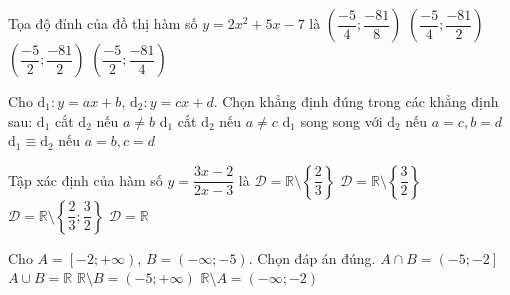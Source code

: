 \begin{ex}%
Tọa độ đỉnh của đồ thị hàm số $y = 2x^2 + 5x -7$ là
	\choice
	{\True $\left(\dfrac{-5}{4}; \dfrac{-81}{8}\right)$}
	{$\left(\dfrac{-5}{4}; \dfrac{-81}{2}\right)$}
	{$\left(\dfrac{-5}{2}; \dfrac{-81}{2}\right)$}
	{$\left(\dfrac{-5}{2}; \dfrac{-81}{4}\right)$}
\end{ex}

\begin{ex}%
Cho $\mathrm{d}_1\colon y = ax + b$, $\mathrm{d}_2\colon y = cx + d$. Chọn khẳng định đúng trong các khẳng định sau:
	\choice
	{$\mathrm{d}_1$ cắt $\mathrm{d}_2$ nếu $a \neq b$}
	{\True $\mathrm{d}_1$ cắt $\mathrm{d}_2$ nếu $a \neq c$}
	{$\mathrm{d}_1$ song song với $\mathrm{d}_2$ nếu $a = c, b = d$}
	{$\mathrm{d}_1 \equiv \mathrm{d}_2$ nếu $a = b, c = d$}
\end{ex}

\begin{ex}%
Tập xác định của hàm số $y = \dfrac{3x - 2}{2x - 3}$ là
	\choice
	{$\mathscr{D} = \mathbb{R}\setminus \left\lbrace \dfrac{2}{3}\right\rbrace $}
	{\True $\mathscr{D} = \mathbb{R}\setminus \left\lbrace \dfrac{3}{2}\right\rbrace $}
	{$\mathscr{D} = \mathbb{R}\setminus \left\lbrace \dfrac{2}{3}; \dfrac{3}{2}\right\rbrace $}
	{$\mathscr{D} = \mathbb{R}$}
\end{ex}


\begin{ex}%
Cho $A = \left[ -2; +\infty\right)$, $B = \left( -\infty; -5\right)$. Chọn đáp án đúng.
	\choice
	{$A \cap B = \left( -5; -2\right] $}
	{$A \cup B = \mathbb{R} $}
	{$\mathbb{R}\setminus B = \left( -5; +\infty \right)$}
	{\True $\mathbb{R}\setminus A = \left( -\infty; -2 \right)$}
\end{ex}

